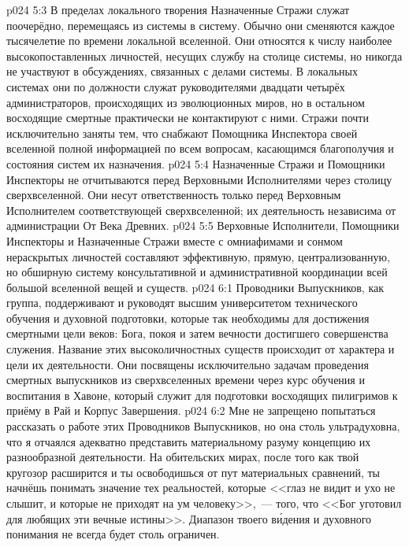 \vs p024 5:3 В пределах локального творения Назначенные Стражи служат поочерёдно, перемещаясь из системы в систему. Обычно они сменяются каждое тысячелетие по времени локальной вселенной. Они относятся к числу наиболее высокопоставленных личностей, несущих службу на столице системы, но никогда не участвуют в обсуждениях, связанных с делами системы. В локальных системах они по должности служат руководителями двадцати четырёх администраторов, происходящих из эволюционных миров, но в остальном восходящие смертные практически не контактируют с ними. Стражи почти исключительно заняты тем, что снабжают Помощника Инспектора своей вселенной полной информацией по всем вопросам, касающимся благополучия и состояния систем их назначения.
\vs p024 5:4 Назначенные Стражи и Помощники Инспекторы не отчитываются перед Верховными Исполнителями через столицу сверхвселенной. Они несут ответственность только перед Верховным Исполнителем соответствующей сверхвселенной; их деятельность независима от администрации От Века Древних.
\vs p024 5:5 \pc Верховные Исполнители, Помощники Инспекторы и Назначенные Стражи вместе с омниафимами и сонмом нераскрытых личностей составляют эффективную, прямую, централизованную, но обширную систему консультативной и административной координации всей большой вселенной вещей и существ.
\vs p024 6:1 Проводники Выпускников, как группа, поддерживают и руководят высшим университетом технического обучения и духовной подготовки, которые так необходимы для достижения смертными цели веков: Бога, покоя и затем вечности достигшего совершенства служения. Название этих высоколичностных существ происходит от характера и цели их деятельности. Они посвящены исключительно задачам проведения смертных выпускников из сверхвселенных времени через курс обучения и воспитания в Хавоне, который служит для подготовки восходящих пилигримов к приёму в Рай и Корпус Завершения.
\vs p024 6:2 Мне не запрещено попытаться рассказать о работе этих Проводников Выпускников, но она столь ультрадуховна, что я отчаялся адекватно представить материальному разуму концепцию их разнообразной деятельности. На обительских мирах, после того как твой кругозор расширится и ты освободишься от пут материальных сравнений, ты начнёшь понимать значение тех реальностей, которые <<глаз не видит и ухо не слышит, и которые не приходят на ум человеку>>,~--- того, что <<Бог уготовил для любящих эти вечные истины>>. Диапазон твоего в\'идения и духовного понимания не всегда будет столь ограничен.
